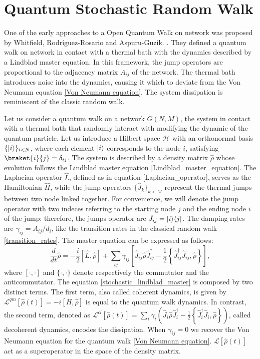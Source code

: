 \section{Quantum Stochastic Random Walk}\label{C_Quantum Stochastic Walk}

One of the early approaches to a Open Quantum Walk on network was proposed by Whitfield, Rodr\'iguez-Rosario and Aspuru-Guzik. \cite{QSW}. They defined a quantum walk on network in contact with a thermal bath with the dynamics described by a Lindblad master equation. In this framework, the jump operators are proportional to the adjacency  matrix $A_{ij}$ of the network. The thermal bath introduces noise into the dynamics, causing it which to deviate from the  Von Neumann equation \eqref{Von Neumann equation}. The system dissipation is reminiscent of the classic random walk.

Let us consider a quantum walk on a network $G(N,M)$, the system in contact with a thermal bath that randomly interact with modifying the dynamic of the quantum particle.
Let us introduce a Hilbert space $\mathcal{H}$ with an orthonormal basis $\{\lvert i\rangle\}_{i<N}$, where each element $\lvert i\rangle$ corresponds to the node $i$, satisfying $\braket{i}{j}=\delta_{ij}$. The system is described by a density matrix $\hat \rho$ whose evolution follows the Lindblad master equation \eqref{Lindblad_master_equation}.
The Laplacian operator $\hat L$, defined as in equation \eqref{Laplacian_operator}, serves as the Hamiltonian $\hat H$, while the jump operators $\{\hat J_k\}_{k<M}$ represent the thermal jumps between two node linked together. For convenience, we will denote the jump operator with two indeces referring to the starting node $j$ and the ending node $i$ of the jump: therefore, the jumps operator are $\hat J_{ij} = \lvert i\rangle\langle j\rvert$. The damping rates are $\gamma_{ij} =A_{ij}/d_i$, like the transition rates in the classical random walk \eqref{transition_rates}.
The master equation can be expressed as follows:
\begin{equation}\label{stochastic_lindblad_master}
    \frac{d}{dt}\hat \rho = -\frac{i}{2}\left[\hat L,\hat\rho\right] + \sum_{ij}\gamma_{ij}\left[\hat J_{ij} \hat\rho\hat J_{ij}^\dagger -\frac{1}{2} \left\{ \hat J_{ij}^\dagger \hat J_{ij}, \hat\rho\right\}\right],
\end{equation}
where $[\cdot,\cdot]$ and $\{\cdot,\cdot\}$ denote respectively the commutator and the anticommutator.
The equation \eqref{stochastic_lindblad_master} is composed by two distinct terms. The first term, also called coherent dynamics,  is given by
$\mathcal{L}^{qm}\left[\hat\rho(t)\right] = -i\left[H,\hat\rho\right]$ is equal to the quantum walk dynamics. In contrast, the second term, denoted as $\mathcal{L}^{cl}\left[\hat\rho(t)\right] = \sum_i \gamma_i \left(\hat J_i \hat\rho \hat J^\dagger_i - \frac{1}{2}\left\{ \hat J^\dagger_i\hat J_i, \hat\rho\right\} \right)$, called decoherent dynamics, encodes the dissipation. 
When $\gamma_{ij} = 0$ we recover the Von Neumann equation for the quantum walk \eqref{Von Neumann equation}. 
$\mathcal{L}\left[\hat\rho(t)\right]$ act as a superoperator in the space of the density matrix.

